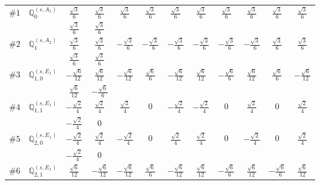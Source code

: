 \documentclass[fleqn,9pt,landscape]{jsarticle}
\begin{document}
\begin{center}
\begin{longtable}{lcccccccccc}
$ \#1\quad \mathbb{Q}_{0}^{(s,A_{1})} $ & $ \frac{\sqrt{3}}{6} $ & $ \frac{\sqrt{3}}{6} $ & $ \frac{\sqrt{3}}{6} $ & $ \frac{\sqrt{3}}{6} $ & $ \frac{\sqrt{3}}{6} $ & $ \frac{\sqrt{3}}{6} $ & $ \frac{\sqrt{3}}{6} $ & $ \frac{\sqrt{3}}{6} $ & $ \frac{\sqrt{3}}{6} $ & $ \frac{\sqrt{3}}{6} $ \\
& $ \frac{\sqrt{3}}{6} $ & $ \frac{\sqrt{3}}{6} $ & $  $ & $  $ & $  $ & $  $ & $  $ & $  $ & $  $ & $  $ \\ \hline
$ \#2\quad \mathbb{Q}_{1}^{(s,A_{2})} $ & $ \frac{\sqrt{3}}{6} $ & $ \frac{\sqrt{3}}{6} $ & $ - \frac{\sqrt{3}}{6} $ & $ - \frac{\sqrt{3}}{6} $ & $ - \frac{\sqrt{3}}{6} $ & $ - \frac{\sqrt{3}}{6} $ & $ - \frac{\sqrt{3}}{6} $ & $ - \frac{\sqrt{3}}{6} $ & $ \frac{\sqrt{3}}{6} $ & $ \frac{\sqrt{3}}{6} $ \\
& $ \frac{\sqrt{3}}{6} $ & $ \frac{\sqrt{3}}{6} $ & $  $ & $  $ & $  $ & $  $ & $  $ & $  $ & $  $ & $  $ \\ \hline
$ \#3\quad \mathbb{Q}_{1,0}^{(s,E_{1})} $ & $ - \frac{\sqrt{6}}{12} $ & $ \frac{\sqrt{6}}{12} $ & $ - \frac{\sqrt{6}}{12} $ & $ \frac{\sqrt{6}}{6} $ & $ - \frac{\sqrt{6}}{12} $ & $ \frac{\sqrt{6}}{12} $ & $ - \frac{\sqrt{6}}{6} $ & $ \frac{\sqrt{6}}{12} $ & $ \frac{\sqrt{6}}{6} $ & $ - \frac{\sqrt{6}}{12} $ \\
& $ \frac{\sqrt{6}}{12} $ & $ - \frac{\sqrt{6}}{6} $ & $  $ & $  $ & $  $ & $  $ & $  $ & $  $ & $  $ & $  $ \\ \hline
$ \#4\quad \mathbb{Q}_{1,1}^{(s,E_{1})} $ & $ - \frac{\sqrt{2}}{4} $ & $ \frac{\sqrt{2}}{4} $ & $ \frac{\sqrt{2}}{4} $ & $ 0 $ & $ - \frac{\sqrt{2}}{4} $ & $ - \frac{\sqrt{2}}{4} $ & $ 0 $ & $ \frac{\sqrt{2}}{4} $ & $ 0 $ & $ \frac{\sqrt{2}}{4} $ \\
& $ - \frac{\sqrt{2}}{4} $ & $ 0 $ & $  $ & $  $ & $  $ & $  $ & $  $ & $  $ & $  $ & $  $ \\ \hline
$ \#5\quad \mathbb{Q}_{2,0}^{(s,E_{1})} $ & $ - \frac{\sqrt{2}}{4} $ & $ \frac{\sqrt{2}}{4} $ & $ - \frac{\sqrt{2}}{4} $ & $ 0 $ & $ \frac{\sqrt{2}}{4} $ & $ \frac{\sqrt{2}}{4} $ & $ 0 $ & $ - \frac{\sqrt{2}}{4} $ & $ 0 $ & $ \frac{\sqrt{2}}{4} $ \\
& $ - \frac{\sqrt{2}}{4} $ & $ 0 $ & $  $ & $  $ & $  $ & $  $ & $  $ & $  $ & $  $ & $  $ \\ \hline
$ \#6\quad \mathbb{Q}_{2,1}^{(s,E_{1})} $ & $ \frac{\sqrt{6}}{12} $ & $ - \frac{\sqrt{6}}{12} $ & $ - \frac{\sqrt{6}}{12} $ & $ \frac{\sqrt{6}}{6} $ & $ - \frac{\sqrt{6}}{12} $ & $ \frac{\sqrt{6}}{12} $ & $ - \frac{\sqrt{6}}{6} $ & $ \frac{\sqrt{6}}{12} $ & $ - \frac{\sqrt{6}}{6} $ & $ \frac{\sqrt{6}}{12} $ \\

\end{longtable}
\end{center}
\end{document}
